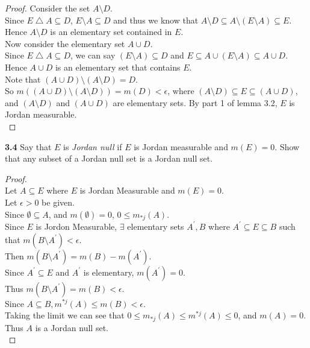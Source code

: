\documentclass[12pt]{article}
\begin{document}
\begin{proof}
		Consider the set $A \setminus D$. \\
		Since $E \bigtriangleup A \subseteq D$, $E \setminus A \subseteq D$ and thus we know that $A \setminus D \subseteq A \setminus (E \setminus A) \subseteq E$. Hence $A \setminus D$ is an elementary set contained in $E$. \\
		
		Now consider the elementary set $A \cup D$. \\
		Since $E \bigtriangleup A \subseteq D$, we can say $(E \setminus A) \subseteq D$ and $E \subseteq A \cup (E \setminus A) \subseteq A \cup D$. \\
		Hence $A \cup D$ is an elementary set that contains $E$. \\
		
		Note that $(A \cup D) \setminus (A \setminus D) = D$.\\
		So $m((A \cup D) \setminus (A \setminus D)) = m(D) < \epsilon$, where $(A \setminus D) \subseteq E \subseteq (A \cup D)$, and $(A \setminus D)$ and $(A \cup D)$ are elementary sets. By part 1 of lemma 3.2, $E$ is Jordan measurable. \\		
	\end{proof}

\hspace{-4 ex}\textbf{3.4} Say that $E$ is \emph{Jordan null} if $E$ is Jordan measurable and $m(E)=0$. Show that any subset of a Jordan null set is a Jordan null set. \bigbreak

	\begin{proof}\text{ }\\
		Let $A \subseteq E$ where $E$ is Jordan Measurable and $m(E)=0$. \\
		Let $\epsilon >0$ be given.\\
		Since $\emptyset \subseteq A$, and $m(\emptyset)=0$,  $0 \leq m_{*j}(A)$.\\
		Since $E$ is Jordon Measurable, $\exists$ elementary sets $A^{\prime}, B$ where $A^{\prime} \subseteq E \subseteq B$ such that $m(B \setminus A^{\prime})<\epsilon$. \\
		Then $m(B \setminus A^{\prime}) = m(B) - m(A^{\prime})$. \\
		Since $A^{\prime} \subseteq E$ and $A^\prime$ is elementary, $m(A^{\prime}) = 0$. \\
		Thus $m(B \setminus A^{\prime}) = m(B) < \epsilon$. \\
		Since $A \subseteq B, m^{*j}(A) \leq m(B) < \epsilon$. \\
		Taking the limit we can see that $0 \leq m_{*j}(A) \leq m^{*j}(A) \leq 0$, and $m(A)=0$.\\
		Thus $A$ is a Jordan null set.\\	
	\end{proof}
\end{document}
